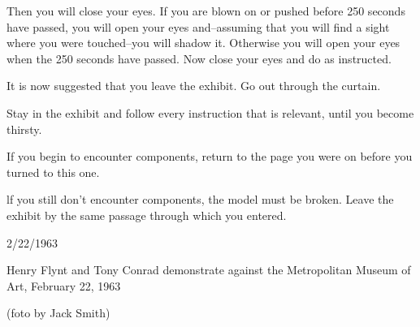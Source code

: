 Then you will close your eyes. If you are blown on or pushed before 
250 seconds have passed, you will open your eyes and--assuming that you 
will find a sight where you were touched--you will shadow it. Otherwise you 
will open your eyes when the 250 seconds have passed. Now close your eyes 
and do as instructed. 


It is now suggested that you leave the exhibit. Go out through the 
curtain. 

\clearpage

Stay in the exhibit and follow every instruction that is relevant, until
you become thirsty. 


If you begin to encounter components, return to the page you were on 
before you turned to this one. 


lf you still don't encounter components, the model must be broken. 
Leave the exhibit by the same passage through which you entered. 

\clearpage


2/22/1963 


Henry Flynt and Tony Conrad demonstrate against the Metropolitan Museum of Art, 
February 22, 1963 


(foto by Jack Smith)

